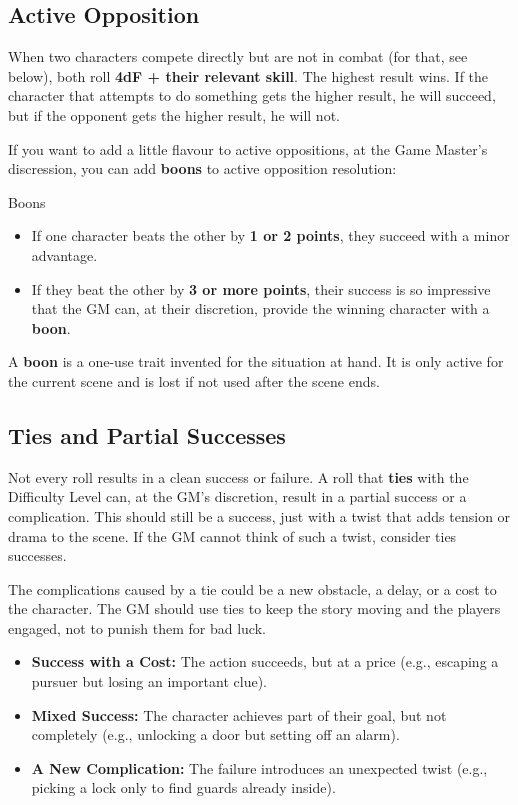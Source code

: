 \begin{multicols}{2}
\subsection{Active Opposition}
When two characters compete directly but are not in combat (for that, see below), both roll \textbf{4dF + their relevant skill}. The highest result wins. If the character that attempts to do something gets the higher result, he will succeed, but if the opponent gets the higher result, he will not.

If you want to add a little flavour to active oppositions, at the Game Master's discression, you can add \textbf{boons} to active opposition resolution:

\begin{Example}{Boons}
	\begin{itemize}
    	\item If one character beats the other by \textbf{1 or 2 points}, they succeed with a minor advantage.
	    \item If they beat the other by \textbf{3 or more points}, their success is so impressive that the GM can, at their discretion, provide the winning character with a \textbf{boon}.
	\end{itemize}
\end{Example}

A \textbf{boon} is a one-use trait invented for the situation at hand. It is only active for the current scene and is lost if not used after the scene ends.

\subsection{Ties and Partial Successes}
Not every roll results in a clean success or failure. A roll that \textbf{ties} with the Difficulty Level can, at the GM's discretion, result in a partial success or a complication. This should still be a success, just with a twist that adds tension or drama to the scene. If the GM cannot think of such a twist, consider ties successes.

The complications caused by a tie could be a new obstacle, a delay, or a cost to the character. The GM should use ties to keep the story moving and the players engaged, not to punish them for bad luck.
\begin{itemize}
    \item \textbf{Success with a Cost:} The action succeeds, but at a price (e.g., escaping a pursuer but losing an important clue).
    \item \textbf{Mixed Success:} The character achieves part of their goal, but not completely (e.g., unlocking a door but setting off an alarm).
    \item \textbf{A New Complication:} The failure introduces an unexpected twist (e.g., picking a lock only to find guards already inside).
\end{itemize}



\end{multicols}
